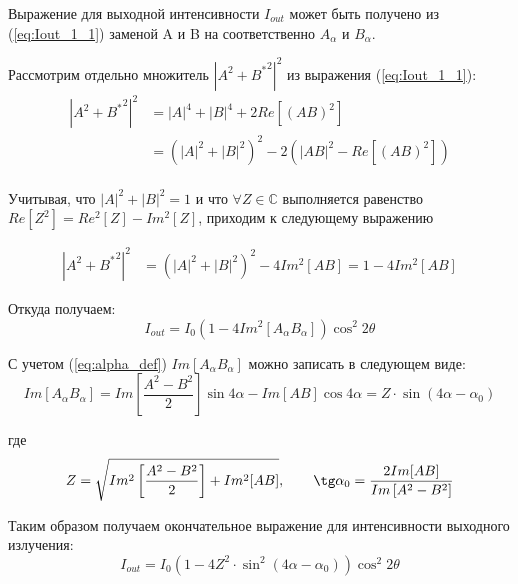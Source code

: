 \documentclass{article}
\begin{document}
Выражение для выходной интенсивности $I_{out}$ может быть получено из (\ref{eq:Iout_1_1}) заменой A и B на соответственно $A_\alpha$ и $B_\alpha$.

Рассмотрим отдельно множитель $\left| A^2 + {B^*}^2 \right|^2$ из выражения (\ref{eq:Iout_1_1}):
\begin{equation}
	\begin{split}
		\left| A^2 + {B^*}^2 \right|^2 &= |A|^4 + |B|^4 + 2Re\left[ (A B)^2\right]\\
		&=\left( |A|^2 + |B|^2\right)^2 - 2\left(|A B|^2 - Re\left[ (A B)^2\right]\right)\\
	\end{split}
\end{equation}	

Учитывая, что $|A|^2 + |B|^2 = 1$ и что $\forall Z \in \mathbb{C}$ выполняется равенство $Re\left[ Z^2\right] = Re^2\left[ Z\right] - Im^2\left[ Z\right]
$, приходим к следующему выражению

\begin{equation}
	\begin{split}
		\left| A^2 + {B^*}^2 \right|^2 	&=\left( |A|^2 + |B|^2\right)^2 - 4Im^2[A B] = 1 - 4Im^2[A B]
	\end{split}	
\end{equation}

Откуда получаем:
\begin{equation}
	\label{eq:Iout_our_1}
	I_{out} =  I_0 \left( 1 - 4Im^2[A_\alpha B_\alpha]\right)  \cos^2 2 \theta
\end{equation}

С учетом (\ref{eq:alpha_def}) $Im[A_\alpha B_\alpha]$ можно записать в следующем виде:
\begin{equation}
		Im[A_\alpha B_\alpha]  = Im\left[ \frac{A^2-B^2}{2} \right]\sin 4 \alpha - Im[AB]\cos 4 \alpha = Z \cdot \sin(4\alpha - \alpha_0)
\end{equation}


где
\begin{equation}
	Z = \sqrt{Im^2\left[\frac{A^2-B^2}{2}\right]+Im^2[AB]}, \qquad \tg\alpha_0 = \frac{2Im[AB]}{Im\left[A^2 - B^2\right]}
\end{equation}

Таким образом получаем окончательное выражение для интенсивности выходного излучения: 
 \begin{equation}
 	I_{out} =  I_0 \left( 1 - 4 Z^2 \cdot \sin^2(4\alpha - \alpha_0)\right)  \cos^2 2 \theta
 \end{equation}
 

\printbibliography
\end{document}
